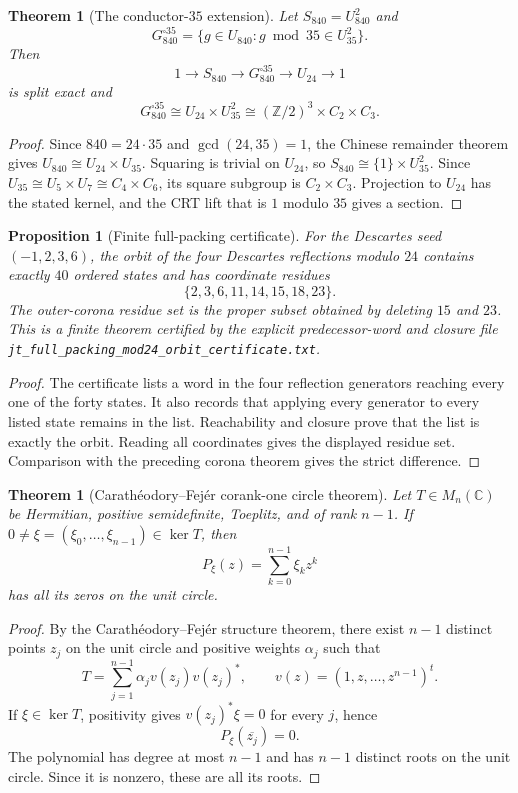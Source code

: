 \documentclass[11pt]{article}
\newtheorem{theorem}[definition]{Theorem}
\newtheorem{proposition}[definition]{Proposition}
\newcommand{\Z}{\mathbb Z}
\newcommand{\C}{\mathbb C}
\begin{document}
\begin{theorem}[The conductor-$35$ extension]
Let $S_{840}=U_{840}^2$ and
\[
G_{840}^{\square35}=\{g\in U_{840}:g\bmod35\in U_{35}^2\}.
\]
Then
\[
1\to S_{840}\to G_{840}^{\square35}\to U_{24}\to1
\]
is split exact and
\[
G_{840}^{\square35}\cong U_{24}\times U_{35}^2
\cong(\Z/2)^3\times C_2\times C_3.
\]
\end{theorem}

\begin{proof}
Since $840=24\cdot35$ and $\gcd(24,35)=1$, the Chinese remainder theorem gives $U_{840}\cong U_{24}\times U_{35}$.  Squaring is trivial on $U_{24}$, so $S_{840}\cong\{1\}\times U_{35}^2$.  Since $U_{35}\cong U_5\times U_7\cong C_4\times C_6$, its square subgroup is $C_2\times C_3$.  Projection to $U_{24}$ has the stated kernel, and the CRT lift that is $1$ modulo $35$ gives a section.
\end{proof}

\begin{proposition}[Finite full-packing certificate]
For the Descartes seed $(-1,2,3,6)$, the orbit of the four Descartes reflections modulo $24$ contains exactly $40$ ordered states and has coordinate residues
\[
\{2,3,6,11,14,15,18,23\}.
\]
The outer-corona residue set is the proper subset obtained by deleting $15$ and $23$.  This is a finite theorem certified by the explicit predecessor-word and closure file \texttt{jt\_full\_packing\_mod24\_orbit\_certificate.txt}.
\end{proposition}

\begin{proof}
The certificate lists a word in the four reflection generators reaching every one of the forty states.  It also records that applying every generator to every listed state remains in the list.  Reachability and closure prove that the list is exactly the orbit.  Reading all coordinates gives the displayed residue set.  Comparison with the preceding corona theorem gives the strict difference.
\end{proof}

\begin{theorem}[Carath\'eodory--Fej\'er corank-one circle theorem]
Let $T\in M_n(\C)$ be Hermitian, positive semidefinite, Toeplitz, and of rank $n-1$.  If $0\ne\xi=(\xi_0,\ldots,\xi_{n-1})\in\ker T$, then
\[
P_\xi(z)=\sum_{k=0}^{n-1}\xi_kz^k
\]
has all its zeros on the unit circle.
\end{theorem}

\begin{proof}
By the Carath\'eodory--Fej\'er structure theorem, there exist $n-1$ distinct points $z_j$ on the unit circle and positive weights $\alpha_j$ such that
\[
T=\sum_{j=1}^{n-1}\alpha_jv(z_j)v(z_j)^*,
\qquad
v(z)=(1,z,\ldots,z^{n-1})^t.
\]
If $\xi\in\ker T$, positivity gives $v(z_j)^*\xi=0$ for every $j$, hence
\[
P_\xi(\overline{z_j})=0.
\]
The polynomial has degree at most $n-1$ and has $n-1$ distinct roots on the unit circle.  Since it is nonzero, these are all its roots.
\end{proof}
\end{document}
